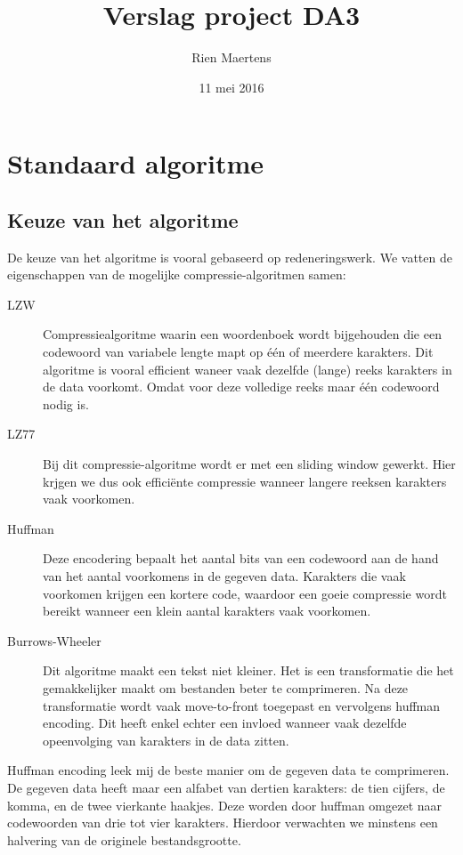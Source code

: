 \documentclass[a4paper]{article}
\author{Rien Maertens}
\title{Verslag project DA3}
\date{11 mei 2016}
\begin{document}
\maketitle

\section{Standaard algoritme}

\subsection{Keuze van het algoritme}

De keuze van het algoritme is vooral gebaseerd op redeneringswerk. We vatten de eigenschappen van de mogelijke compressie-algoritmen samen:
\begin{description}
    \item [LZW] Compressiealgoritme waarin een woordenboek wordt bijgehouden die een codewoord van variabele lengte mapt op één of meerdere karakters. Dit algoritme is vooral efficient waneer vaak dezelfde (lange) reeks karakters in de data voorkomt. Omdat voor deze volledige reeks maar één codewoord nodig is.
    \item [LZ77] Bij dit compressie-algoritme wordt er met een sliding window gewerkt. Hier krjgen we dus ook efficiënte compressie wanneer langere reeksen karakters vaak voorkomen.
    \item [Huffman] Deze encodering bepaalt het aantal bits van een codewoord aan de hand van het aantal voorkomens in de gegeven data. Karakters die vaak voorkomen krijgen een kortere code, waardoor een goeie compressie wordt bereikt wanneer een klein aantal karakters vaak voorkomen.
    \item [Burrows-Wheeler] Dit algoritme maakt een tekst niet kleiner. Het is een transformatie die het gemakkelijker maakt om bestanden beter te comprimeren. Na deze transformatie wordt vaak move-to-front toegepast en vervolgens huffman encoding. Dit heeft enkel echter een invloed wanneer vaak dezelfde opeenvolging van karakters in de data zitten.
\end{description}

Huffman encoding leek mij de beste manier om de gegeven data te comprimeren. De gegeven data heeft maar een alfabet van dertien karakters: de tien cijfers, de komma, en de twee vierkante haakjes. Deze worden door huffman omgezet naar codewoorden van drie tot vier karakters. Hierdoor verwachten we minstens een halvering van de originele bestandsgrootte.
\end{document}
